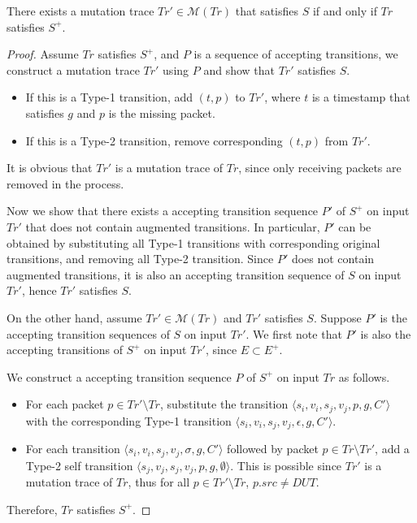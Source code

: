 \begin{theorem}
  There exists a mutation trace $Tr' \in \mathcal{M}(Tr)$ that satisfies $S$ if
  and only if $Tr$ satisfies $S^+$.
 \label{the:equivalent}
\end{theorem}
\begin{proof}
  Assume $Tr$ satisfies $S^+$, and $P$ is a sequence of accepting transitions,
  we construct a mutation trace $Tr'$ using $P$ and show that $Tr'$ satisfies
  $S$.

  \begin{itemize}
    \item If this is a Type-1 transition, add $(t, p)$ to $Tr'$, where $t$ is a
      timestamp that satisfies $g$ and $p$ is the missing packet.
    \item If this is a Type-2 transition, remove corresponding $(t, p)$ from
      $Tr'$.
  \end{itemize}
  It is obvious that $Tr'$ is a mutation trace of $Tr$, since only receiving
  packets are removed in the process.

  Now we show that there exists a accepting transition sequence $P'$ of $S^+$ on
  input $Tr'$ that does not contain augmented transitions.  In particular, $P'$
  can be obtained by substituting all Type-1 transitions with corresponding
  original transitions, and removing all Type-2 transition.  Since $P'$ does not
  contain augmented transitions, it is also an accepting transition sequence of
  $S$ on input $Tr'$, hence $Tr'$ satisfies $S$.

  On the other hand, assume $Tr' \in \mathcal{M}(Tr)$ and $Tr'$ satisfies $S$.
  Suppose $P'$ is the accepting transition sequences of $S$ on input $Tr'$.
  We first note that $P'$ is also the accepting transitions of $S^+$ on input
  $Tr'$, since $E \subset E^+$.

  We construct a accepting transition sequence $P$ of $S^+$ on input $Tr$ as
  follows.
  \begin{itemize}
    \item For each packet $p \in Tr' \setminus Tr$, substitute the transition
      $\langle s_i, v_i, s_j, v_j, p, g, C'\rangle$ with the corresponding Type-1
      transition $\langle s_i, v_i, s_j, v_j, \epsilon, g, C'\rangle$.
    \item For each transition $\langle s_i, v_i, s_j, v_j, \sigma, g, C'\rangle$
      followed by packet $p \in Tr\setminus Tr'$, add a Type-2 self
      transition $\langle s_j, v_j, s_j, v_j, p, g, \emptyset\rangle$. This is
      possible since $Tr'$ is a mutation trace of $Tr$, thus  for all $p \in Tr'
      \setminus Tr$, $p.src \ne DUT$.
  \end{itemize}
  Therefore, $Tr$ satisfies $S^+$.
\end{proof}

